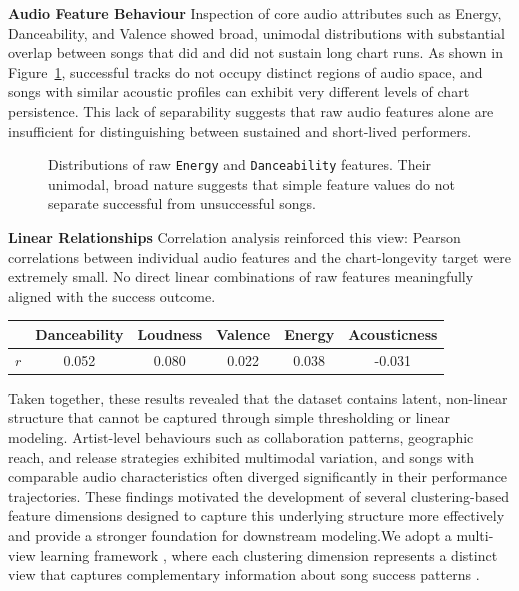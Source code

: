 \documentclass{article}
\begin{document}
\textbf{Audio Feature Behaviour} 
Inspection of core audio attributes such as Energy, Danceability, and Valence showed broad, unimodal distributions with substantial overlap between songs that did and did not sustain long chart runs. As shown in Figure~\ref{fig:distributions}, successful tracks do not occupy distinct regions of audio space, and songs with similar acoustic profiles can exhibit very different levels of chart persistence. This lack of separability suggests that raw audio features alone are insufficient for distinguishing between sustained and short-lived performers.
\vspace{-0.3em}
\begin{figure}[h!]
  \centering
  
  \caption{Distributions of raw \texttt{Energy} and \texttt{Danceability} features. Their unimodal, broad nature suggests that simple feature values do not separate successful from unsuccessful songs.}
  \label{fig:distributions}
\end{figure}
\vspace{-0.8em}

\textbf{Linear Relationships}
Correlation analysis reinforced this view: Pearson correlations between individual audio features and the chart-longevity target were extremely small. No direct linear combinations of raw features meaningfully aligned with the success outcome. 
\begin{table}[h!]
\centering
\begin{tabular}{lccccc}
\toprule
& Danceability & Loudness & Valence & Energy & Acousticness \\
\midrule
$r$ & 0.052 & 0.080 & 0.022 & 0.038 & -0.031 \\
\bottomrule
\end{tabular}
\end{table}
Taken together, these results revealed that the dataset contains latent, non-linear structure that cannot be captured through simple thresholding or linear modeling. Artist-level behaviours such as collaboration patterns, geographic reach, and release strategies exhibited multimodal variation, and songs with comparable audio characteristics often diverged significantly in their performance trajectories. These findings motivated the development of several clustering-based feature dimensions designed to capture this underlying structure more effectively and provide a stronger foundation for downstream modeling.We adopt a multi-view learning framework \cite{bickel2004multiview, xu2013survey}, where each clustering dimension represents a distinct view that captures complementary information about song success patterns \cite{chao2021survey}.
\end{document}
